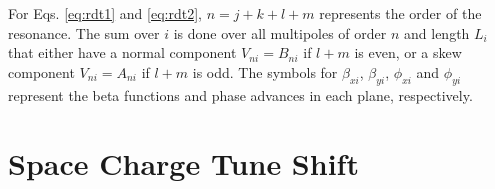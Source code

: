 For Eqs. \ref{eq:rdt1} and \ref{eq:rdt2}, $n=j+k+l+m$ represents the order of the resonance. The sum over $i$ is done over all multipoles of order $n$ and length $L_i$ that either have a normal component $V_{ni}=B_{ni}$ if $l+m$ is even, or a skew component $V_{ni}=A_{ni}$ if $l+m$ is odd. The symbols for $\beta_{xi}$, $\beta_{yi}$, $\phi_{xi}$ and $\phi_{yi}$ represent the beta functions and phase advances in each plane, respectively.

\section{\label{sec:sc1}Space Charge Tune Shift}
